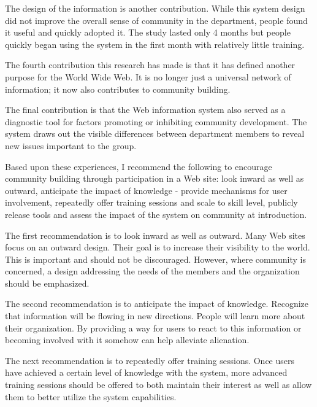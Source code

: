 The design of the information is another contribution.  While this system
design did not improve the overall sense of community in the department, people
found it useful and quickly adopted it.  The study lasted only 4 months but
people quickly began using the system in the first month with relatively little
training.

The fourth contribution this research has made is that it has defined another
purpose for the World Wide Web.  It is no longer just a universal network of
information; it now also contributes to community building.

The final contribution is that the Web information system also served as a
diagnostic tool for factors promoting or inhibiting community development.  The
system draws out the visible differences between department members to reveal
new issues important to the group.

Based upon these experiences, I recommend the following to encourage community
building through participation in a Web site: look inward as well as outward,
anticipate the impact of knowledge - provide mechanisms for user involvement,
repeatedly offer training sessions and scale to skill level, publicly release
tools and assess the impact of the system on community at introduction.

The first recommendation is to look inward as well as outward.  Many Web sites
focus on an outward design.  Their goal is to increase their visibility to the
world.  This is important and should not be discouraged.  However, where
community is concerned, a design addressing the needs of the members and the
organization should be emphasized.

The second recommendation is to anticipate the impact of knowledge.  Recognize
that information will be flowing in new directions.  People will learn more
about their organization.  By providing a way for users to react to this
information or becoming involved with it somehow can help alleviate alienation.

The next recommendation is to repeatedly offer training sessions.  Once users
have achieved a certain level of knowledge with the system, more advanced
training sessions should be offered to both maintain their interest as well as
allow them to better utilize the system capabilities.

